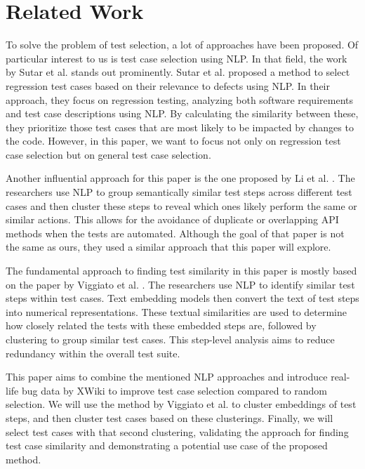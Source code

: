 \section{Related Work}

To solve the problem of test selection, a lot of approaches have been proposed. Of particular interest to us is test case selection using \ac{NLP}. In that field, the work by Sutar et al. \cite{Sutar} stands out prominently. Sutar et al. proposed a method to select regression test cases based on their relevance to defects using \ac{NLP}. In their approach, they focus on regression testing, analyzing both software requirements and test case descriptions using \ac{NLP}. By calculating the similarity between these, they prioritize those test cases that are most likely to be impacted by changes to the code. However, in this paper, we want to focus not only on regression test case selection but on general test case selection.

Another influential approach for this paper is the one proposed by Li et al. \cite{Li}. The researchers use \ac{NLP} to group semantically similar test steps across different test cases and then cluster these steps to reveal which ones likely perform the same or similar actions. This allows for the avoidance of duplicate or overlapping API methods when the tests are automated. Although the goal of that paper is not the same as ours, they used a similar approach that this paper will explore.

The fundamental approach to finding test similarity in this paper is mostly based on the paper by Viggiato et al. \cite{Viggiato}. The researchers use \ac{NLP} to identify similar test steps within test cases. Text embedding models then convert the text of test steps into numerical representations. These textual similarities are used to determine how closely related the tests with these embedded steps are, followed by clustering to group similar test cases. This step-level analysis aims to reduce redundancy within the overall test suite.

This paper aims to combine the mentioned \ac{NLP} approaches and introduce real-life bug data by XWiki to improve test case selection compared to random selection. We will use the method by Viggiato et al. to cluster embeddings of test steps, and then cluster test cases based on these clusterings. Finally, we will select test cases with that second clustering, validating the approach for finding test case similarity and demonstrating a potential use case of the proposed method.